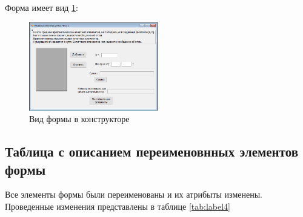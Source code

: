 Форма имеет вид \ref{fig:FormInConstruct4}:

\begin{figure}[!h]
    \centering
    \includegraphics[width = 0.5\textwidth]{images/Task4/FormInConstructor.png}
    \caption{Вид формы в конструкторе}
    \label{fig:FormInConstruct4}
\end{figure}

\newpage
\subsection{Таблица с описанием переименовнных элементов формы}

Все элементы формы были переименованы и их атрибыты изменены. Проведенные изменения представлены в таблице \ref{tab:label4}

